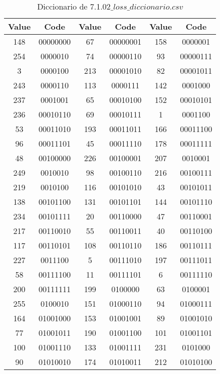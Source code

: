 \documentclass[conference,onecolumn,12pt]{IEEEtran}
\numberwithin{equation}{subsection}
\begin{document}
\begin{table}[h]
\centering
\caption{Diccionario de 7.1.02$\_loss\_diccionario.csv$}
\label{tab:loss_dict_compact}
\begin{tabular}{cccccc}
\hline
\textbf{Value} & \textbf{Code} & \textbf{Value} & \textbf{Code} & \textbf{Value} & \textbf{Code} \\ \hline
148 & 00000000 & 67 & 00000001 & 158 & 0000001 \\ \hline
254 & 0000010 & 74 & 00000110 & 93 & 00000111 \\ \hline
3 & 0000100 & 213 & 00001010 & 82 & 00001011 \\ \hline
243 & 0000110 & 113 & 0000111 & 142 & 0001000 \\ \hline
237 & 0001001 & 65 & 00010100 & 152 & 00010101 \\ \hline
236 & 00010110 & 69 & 00010111 & 1 & 0001100 \\ \hline
53 & 00011010 & 193 & 00011011 & 166 & 00011100 \\ \hline
96 & 00011101 & 45 & 00011110 & 178 & 00011111 \\ \hline
48 & 00100000 & 226 & 00100001 & 207 & 0010001 \\ \hline
249 & 0010010 & 98 & 00100110 & 216 & 00100111 \\ \hline
219 & 0010100 & 116 & 00101010 & 43 & 00101011 \\ \hline
138 & 00101100 & 131 & 00101101 & 144 & 00101110 \\ \hline
234 & 00101111 & 20 & 00110000 & 47 & 00110001 \\ \hline
217 & 00110010 & 55 & 00110011 & 40 & 00110100 \\ \hline
117 & 00110101 & 108 & 00110110 & 186 & 00110111 \\ \hline
227 & 0011100 & 5 & 00111010 & 197 & 00111011 \\ \hline
58 & 00111100 & 11 & 00111101 & 6 & 00111110 \\ \hline
200 & 00111111 & 199 & 0100000 & 63 & 0100001 \\ \hline
255 & 0100010 & 151 & 01000110 & 94 & 01000111 \\ \hline
164 & 01001000 & 153 & 01001001 & 89 & 01001010 \\ \hline
77 & 01001011 & 190 & 01001100 & 101 & 01001101 \\ \hline
100 & 01001110 & 133 & 01001111 & 231 & 0101000 \\ \hline
90 & 01010010 & 174 & 01010011 & 212 & 01010100 \\ \hline

\end{tabular}
\end{table}
\end{document}
